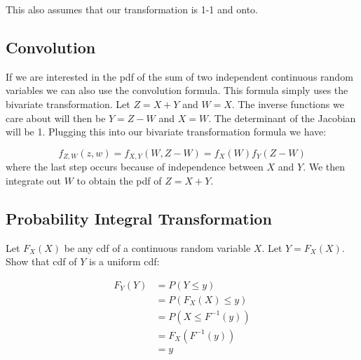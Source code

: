 This also assumes that our transformation is 1-1 and onto.

\subsection{Convolution}
If we are interested in the pdf of the sum of two independent continuous random variables we can also use the convolution formula. This formula simply uses the bivariate transformation. Let $Z=X+Y$ and $W=X$. The inverse functions we care about will then be $Y=Z-W$ and $X=W$. The determinant of the Jacobian will be 1. Plugging this into our bivariate transformation formula we have:

\begin{equation}
f_{Z,W}(z,w) = f_{X,Y}(W, Z-W) = f_X(W)f_Y(Z-W)
\end{equation}
\noindent where the last step occurs because of independence between $X$ and $Y$. We then integrate out $W$ to obtain the pdf of $Z=X+Y$.



\subsection{Probability Integral Transformation}

Let $F_X(X)$ be any cdf of a continuous random variable $X$. Let $Y=F_X(X)$. Show that cdf of $Y$ is a uniform cdf:

\begin{equation}
\begin{split}
F_Y(Y) &= P(Y \leq y) \\ 
& = P(F_X(X) \leq y) \\
&= P(X \leq F^{-1}(y)) \\
&= F_X(F^{-1}(y)) \\
&= y
\end{split}
\end{equation}





